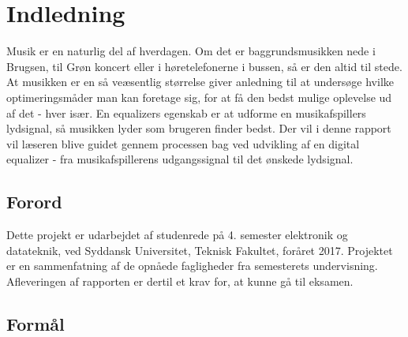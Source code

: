 \chapter{Indledning}
Musik er en naturlig del af hverdagen. Om det er baggrundsmusikken nede i Brugsen, til Grøn koncert eller i høretelefonerne i bussen, så er den altid til stede. At musikken er en så veæsentlig størrelse giver anledning til at undersøge hvilke optimeringsmåder man kan foretage sig, for at få den bedst mulige oplevelse ud af det - hver især. En equalizers egenskab er at udforme en musikafspillers lydsignal, så musikken lyder som brugeren finder bedst.
Der vil i denne rapport vil læseren blive guidet gennem processen bag ved udvikling af en digital equalizer - fra musikafspillerens udgangssignal til det ønskede lydsignal.


\section{Forord}

Dette projekt er udarbejdet af studenrede på 4. semester elektronik og datateknik, ved Syddansk Universitet, Teknisk Fakultet, foråret 2017. Projektet er en sammenfatning af de opnåede fagligheder fra semesterets undervisning. Afleveringen af rapporten er dertil et krav for, at kunne gå til eksamen.




\section{Formål}

